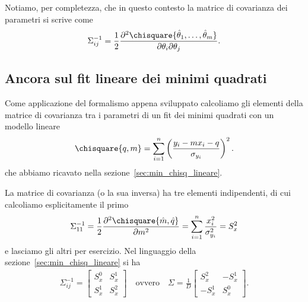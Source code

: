 Notiamo, per completezza, che in questo contesto la matrice di covarianza
dei parametri si scrive come
\begin{align}
  \Sigma^{-1}_{ij} = \frac{1}{2}
  \frac{\partial^2\chisquare{\hat\theta_1,\ldots,\hat\theta_m}}
       {\partial\theta_i \partial\theta_j}.
\end{align}


\subsection{Ancora sul fit lineare dei minimi quadrati}

Come applicazione del formalismo appena sviluppato calcoliamo gli elementi
della matrice di covarianza tra i parametri di un fit dei minimi quadrati
con un modello lineare
\begin{align*}
  \chisquare{q, m} =
  \sum_{i = 1}^{n}\left(\frac{y_i - mx_i - q}{\sigma_{y_i}}\right)^2.
\end{align*}
che abbiamo ricavato nella sezione~\ref{sec:min_chisq_lineare}.

La matrice di covarianza (o la sua inversa) ha tre elementi indipendenti, di
cui calcoliamo esplicitamente il primo
\begin{align*}
  \Sigma^{-1}_{11} =
  \frac{1}{2} \frac{\partial^2\chisquare{\hat m, \hat q}}{\partial m^2} =
  \sum_{i = 1}^{n} \frac{x_i^2}{\sigma_{y_i}^2} = S^2_x
\end{align*}
e lasciamo gli altri per esercizio. Nel linguaggio della
sezione~\ref{sec:min_chisq_lineare} si ha
\begin{align*}
  \Sigma^{-1}_{ij} =
  \begin{bmatrix}
    S_x^0 & S_x^1\\
    S_x^1 & S_x^2
  \end{bmatrix} \quad \text{ovvero} \quad
  \Sigma = \frac{1}{D}
  \begin{bmatrix}
    S_x^2 & -S_x^1\\
    -S_x^1 & S_x^0
  \end{bmatrix}.
\end{align*}


\summary
